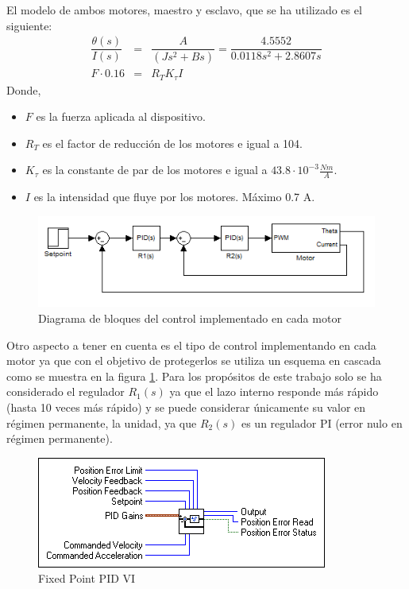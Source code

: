 El modelo de ambos motores, maestro y esclavo, que se ha utilizado es el siguiente:
\begin{eqnarray}
\dfrac{\theta(s)}{I(s)} &=& \dfrac{A}{(J s^2+B s)} = \dfrac{4.5552}{0.0118s^2 + 2.8607s} \\[0.5cm]
F \cdot 0.16 &=& R_T K_\tau I \nonumber
\label{eq:model}
\end{eqnarray}
Donde,
\begin{itemize}
\item $F$ es la fuerza aplicada al dispositivo.
\item $R_T$ es el factor de reducción de los motores e igual a 104.
\item $K_\tau$ es la constante de par de los motores e igual a $43.8\cdot 10^{-3} \frac{Nm}{A}$.
\item $I$ es la intensidad que fluye por los motores. Máximo 0.7 A.
\end{itemize}
\begin{figure}[htbp]
\centering
	\includegraphics[scale=0.5]{cascada}
	\caption{Diagrama de bloques del control implementado en cada motor} %
  	\label{fig:cascada} %
\end{figure}
Otro aspecto a tener en cuenta es el tipo de control implementando en cada motor ya que con el objetivo de protegerlos se utiliza un esquema en cascada como se muestra en la figura \ref{fig:cascada}. Para los propósitos de este trabajo solo se ha considerado el regulador $R_1(s)$ ya que el lazo interno responde más rápido (hasta 10 veces más rápido) y se puede considerar únicamente su valor en régimen permanente, la unidad, ya que $R_2(s)$ es un regulador PI (error nulo en régimen permanente).
\begin{figure}[htbp]
\centering
	\includegraphics[scale=0.6]{fixedPointPID}
	\caption{Fixed Point PID VI} 
  	\label{fig:fixedPID}
\end{figure}
